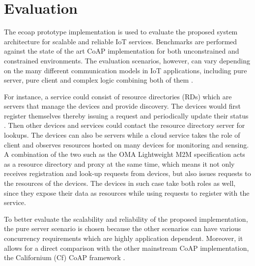 \chapter{Evaluation}\label{ch5}

The ecoap prototype implementation is used to evaluate the proposed system architecture for scalable and reliable IoT services. Benchmarks are performed against the state of the art CoAP implementation for both unconstrained and constrained environments. The evaluation scenarios, however, can vary depending on the many different communication models in IoT applications, including pure server, pure client and complex logic combining both of them \autocite{kovatsch2015scalable}. 

For instance, a service could consist of resource directories (RDs) which are servers that manage the devices and provide discovery. The devices would first register themselves thereby issuing a request and periodically update their status \autocite{core_directory}. Then other devices and services could contact the resource directory server for lookups. The devices can also be servers while a cloud service takes the role of client and observes resources hosted on many devices for monitoring and sensing. A combination of the two such as the OMA Lightweight M2M \autocite{lwm2m} specification acts as a resource directory and proxy at the same time, which means it not only receives registration and look-up requests from devices, but also issues requests to the resources of the devices. The devices in such case take both roles as well, since they expose their data as resources while using requests to register with the service.

To better evaluate the scalability and reliability of the proposed implementation, the pure server scenario is chosen because the other scenarios can have various concurrency requirements which are highly application dependent. Moreover, it allows for a direct comparison with the other mainstream CoAP implementation, the Californium (Cf) CoAP framework \autocite{californium}.

